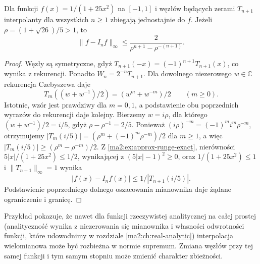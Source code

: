 \begin{twierdzenie}
\label{ma2:thm:approx-runge-chebyshev}
Dla funkcji $f(x)=1/(1+25x^2)$ na $[-1,1]$
i węzłów będących
zerami $T_{n+1}$ interpolanty dla wszystkich
$n\ge1$ zbiegają jednostajnie do $f$.
Jeżeli $\rho=(1+\sqrt{26})/5>1$, to
\[
 \|f-I_nf\|_\infty
 \le\frac{2}{\rho^{n+1}-\rho^{-(n+1)}}.
\]
\end{twierdzenie}
\begin{proof}
Węzły są symetryczne, gdyż
$T_{n+1}(-x)=(-1)^{n+1}T_{n+1}(x)$,
co wynika z rekurencji.
Ponadto $W_n=2^{-n}T_{n+1}$.
Dla dowolnego niezerowego $w\in\mathbb C$
rekurencja Czebyszewa daje
\[
 T_m((w+w^{-1})/2)=(w^m+w^{-m})/2
 \qquad(m\ge0).
\]
Istotnie, wzór jest prawdziwy dla $m=0,1$,
a podstawienie obu poprzednich wyrazów
do rekurencji daje kolejny.
Bierzemy $w=i\rho$, dla którego
$(w+w^{-1})/2=i/5$, gdyż
$\rho-\rho^{-1}=2/5$.
Ponieważ $(i\rho)^{-m}=(-1)^m i^m\rho^{-m}$,
otrzymujemy
$|T_m(i/5)|=(\rho^m+(-1)^m\rho^{-m})/2$
dla $m\ge1$, a więc
$|T_m(i/5)|\ge(\rho^m-\rho^{-m})/2$.
Z \ref{ma2:ex:approx-runge-exact}, nierówności
$5|x|/(1+25x^2)\le1/2$, wynikającej z
$(5|x|-1)^2\ge0$, oraz $1/(1+25x^2)\le1$
i $\|T_{n+1}\|_\infty=1$ wynika
\[
 |f(x)-I_nf(x)|\le 1/|T_{n+1}(i/5)|.
\]
Podstawienie poprzedniego dolnego oszacowania
mianownika daje żądane ograniczenie i granicę.
\end{proof}

Przykład pokazuje, że nawet dla funkcji
rzeczywistej analitycznej na całej prostej
(analityczność wynika z niezerowania się
mianownika i własności odwrotności funkcji,
które udowodnimy w rozdziale
\ref{ma2:ch:real-analytic}) interpolacja wielomianowa może być rozbieżna
w normie supremum. Zmiana węzłów przy tej samej
funkcji i tym samym stopniu może zmienić
charakter zbieżności.

